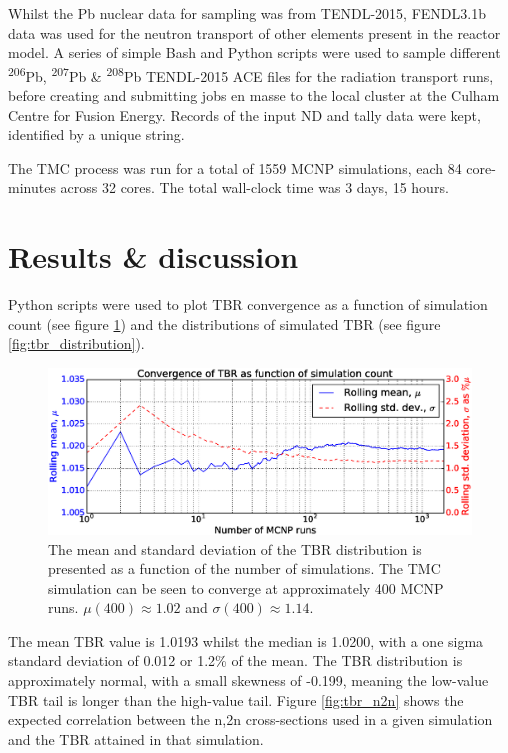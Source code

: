 Whilst the Pb nuclear data for sampling was from TENDL-2015, FENDL3.1b data was used for the neutron transport of other elements present in the reactor model. A series of simple Bash and Python scripts were used to sample different \textsuperscript{206}Pb, \textsuperscript{207}Pb \& \textsuperscript{208}Pb TENDL-2015 ACE files for the radiation transport runs, before creating and submitting jobs en masse to the local cluster at the Culham Centre for Fusion Energy. Records of the input ND and tally data were kept, identified by a unique string.

The TMC process was run for a total of 1559 MCNP simulations, each 84 core-minutes across 32 cores. The total wall-clock time was 3 days, 15 hours.

\section{Results \& discussion}
Python scripts were used to plot TBR convergence as a function of simulation count (see figure \ref{fig:convergence}) and the distributions of simulated TBR (see figure \ref{fig:tbr_distribution}).

\begin{figure}[H]
	\includegraphics[width=\textwidth]{hcll_convergence_1559}
	\caption{The mean and standard deviation of the TBR distribution is presented as a function of the number of simulations. The TMC simulation can be seen to converge at approximately 400 MCNP runs. $\mu(400) \approx 1.02$ and $\sigma(400) \approx 1.14$.}
	\label{fig:convergence}
\end{figure}

The mean TBR value is 1.0193 whilst the median is 1.0200, with a one sigma standard deviation of 0.012 or 1.2\% of the mean. The TBR distribution is approximately normal, with a small skewness of -0.199, meaning the low-value TBR tail is longer than the high-value tail. Figure \ref{fig:tbr_n2n} shows the expected correlation between the n,2n cross-sections used in a given simulation and the TBR attained in that simulation.

